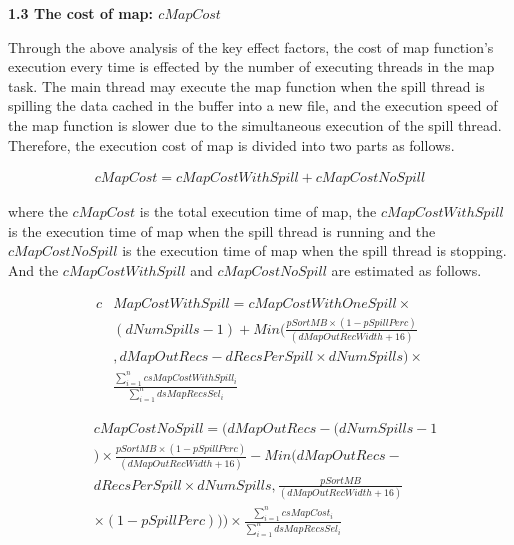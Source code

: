 \noindent\textbf{1.3 The cost of map: $cMapCost$}

Through the above analysis of the key effect factors, the cost of map function's execution every time is effected by the number of executing threads in the map task. The main thread may execute the map function when the spill thread is spilling the data cached in the buffer into a new file, and the execution speed of the map function is slower due to the simultaneous execution of the spill thread. Therefore, the execution cost of map is divided into two parts as follows.
\begin{small}
\begin{equation}
\begin{split}
cMapCost=cMapCostWithSpill+cMapCostNoSpill
\end{split}
\end{equation}
\end{small}
where the $cMapCost$ is the total execution time of map, the $cMapCostWithSpill$ is the execution time of map when the spill thread is running and the $cMapCostNoSpill$ is the execution time of map when the spill thread is stopping. And the $cMapCostWithSpill$ and $cMapCostNoSpill$ are estimated as follows.
\begin{small}
\begin{equation}
\begin{split}
c&MapCostWithSpill=cMapCostWithOneSpill\times \\
&(dNumSpills-1)+Min(\frac{pSortMB\times (1-pSpillPerc)}{(dMapOutRecWidth+16)} \\
&,dMapOutRecs-dRecsPerSpill\times dNumSpills)\times \\
&\frac{\sum_{i=1}^ncsMapCostWithSpill_i}{\sum_{i=1}^ndsMapRecsSel_i} \nonumber
\end{split} 
\end{equation}
\end{small}
\begin{small}
\begin{equation}
\begin{split}
&cMapCostNoSpill=(dMapOutRecs-(dNumSpills-1 \\
&)\times\frac{pSortMB\times (1-pSpillPerc)}{(dMapOutRecWidth+16)}-Min(dMapOutRecs - \\
&dRecsPerSpill\times dNumSpills, \frac{pSortMB}{(dMapOutRecWidth+16)} \\
&\times (1-pSpillPerc)))\times \frac{\sum_{i=1}^ncsMapCost_i}{\sum_{i=1}^ndsMapRecsSel_i} \nonumber
\end{split}
\end{equation}
\end{small}
